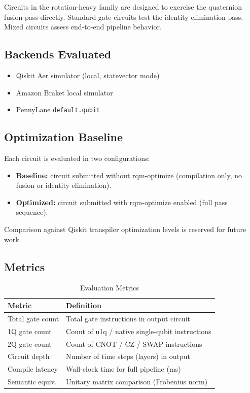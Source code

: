 \documentclass[conference]{IEEEtran}
\begin{document}
Circuits in the rotation-heavy family are designed to exercise the quaternion fusion pass
directly. Standard-gate circuits test the identity elimination pass. Mixed circuits assess
end-to-end pipeline behavior.

\subsection{Backends Evaluated}

\begin{itemize}
\item Qiskit Aer simulator (local, statevector mode)
\item Amazon Braket local simulator
\item PennyLane \texttt{default.qubit}
\end{itemize}

\subsection{Optimization Baseline}

Each circuit is evaluated in two configurations:
\begin{itemize}
\item \textbf{Baseline:} circuit submitted without rqm-optimize (compilation only, no fusion
or identity elimination).
\item \textbf{Optimized:} circuit submitted with rqm-optimize enabled (full pass sequence).
\end{itemize}
Comparison against Qiskit transpiler optimization levels is reserved for future work.

\subsection{Metrics}

\begin{table}[htbp]
\caption{Evaluation Metrics}
\begin{center}
\begin{tabular}{p{2.4cm}p{5.0cm}}
\toprule
\textbf{Metric} & \textbf{Definition} \\
\midrule
Total gate count   & Total gate instructions in output circuit \\
1Q gate count      & Count of u1q / native single-qubit instructions \\
2Q gate count      & Count of CNOT / CZ / SWAP instructions \\
Circuit depth      & Number of time steps (layers) in output \\
Compile latency    & Wall-clock time for full pipeline (ms) \\
Semantic equiv.    & Unitary matrix comparison (Frobenius norm) \\
\bottomrule
\end{tabular}
\label{tab:metrics}
\end{center}
\end{table}
\end{document}
